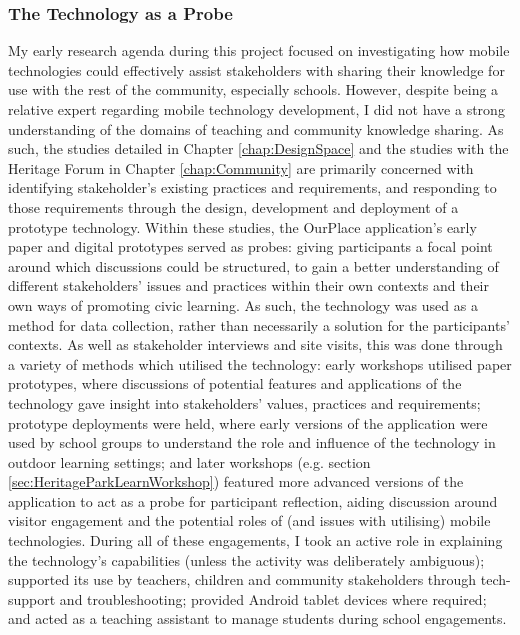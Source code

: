 \subsubsection{The Technology as a Probe}
My early research agenda during this project focused on investigating how mobile technologies could effectively assist stakeholders with sharing their knowledge for use with the rest of the community, especially schools. However, despite being a relative expert regarding mobile technology development, I did not have a strong understanding of the domains of teaching and community knowledge sharing. As such, the studies detailed in Chapter \ref{chap:DesignSpace} and the studies with the Heritage Forum in Chapter \ref{chap:Community} are primarily concerned with identifying stakeholder's existing practices and requirements, and responding to those requirements through the design, development and deployment of a prototype technology. Within these studies, the OurPlace application's early paper and digital prototypes served as probes: giving participants a focal point around which discussions could be structured, to gain a better understanding of different stakeholders’ issues and practices within their own contexts and their own ways of promoting civic learning. As such, the technology was used as a method for data collection, rather than necessarily a solution for the participants' contexts. As well as stakeholder interviews and site visits, this was done through a variety of methods which utilised the technology: early workshops utilised paper prototypes, where discussions of potential features and applications of the technology gave insight into stakeholders' values, practices and requirements; prototype deployments were held, where early versions of the application were used by school groups to understand the role and influence of the technology in outdoor learning settings; and later workshops (e.g. section \ref{sec:HeritageParkLearnWorkshop}) featured more advanced versions of the application to act as a probe for participant reflection, aiding discussion around visitor engagement and the potential roles of (and issues with utilising) mobile technologies. During all of these engagements, I took an active role in explaining the technology's capabilities (unless the activity was deliberately ambiguous); supported its use by teachers, children and community stakeholders through tech-support and troubleshooting; provided Android tablet devices where required; and acted as a teaching assistant to manage students during school engagements.

